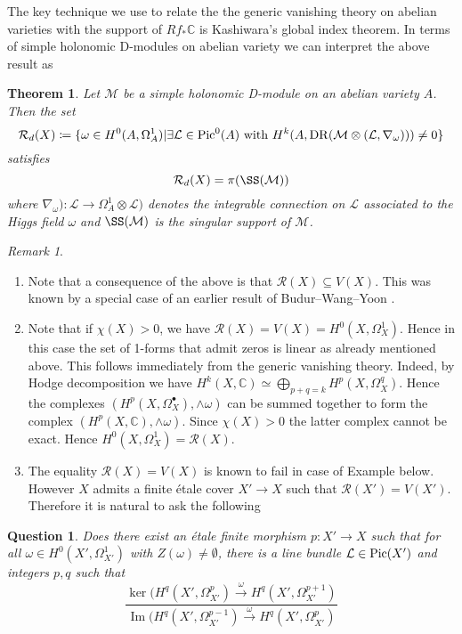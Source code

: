 \documentclass[12pt,reqno]{amsart}
\newtheorem{alphtheorem}{Theorem}
\theoremstyle{question}
\newtheorem{question}[theorem]{Question}
\theoremstyle{definition}
\theoremstyle{remark}
\newtheorem{remark}[theorem]{Remark}
\theoremstyle{cited}
\theoremstyle{citeddef}
\DeclareMathOperator{\im}{Im}
\def\Pic{{\rm Pic}}
\newcommand{\sL}{\mathcal{L}}
\newcommand{\sM}{\mathcal{M}}
\newcommand{\sR}{\mathcal{R}}
\newcommand{\bbC}{\mathbb{C}}
\DeclareMathOperator{\dr}{DR}
\begin{document}
The key technique we
use to relate the the generic vanishing theory on abelian varieties with the support of $Rf_*\bbC$ is Kashiwara's
global index theorem. In terms of simple holonomic D-modules
on abelian variety we can interpret the above result as

\begin{alphtheorem}
Let $\sM$ be a simple holonomic D-module on an abelian variety $A$.
Then the set
\[\sR_d(X)\coloneqq \{\omega\in H^0(A, \Omega_A^1)|\exists \sL\in \Pic^0(A) \text{ with }
H^{k}(A, \dr(\sM\otimes(\sL, \nabla_{\omega}))) \neq 0\}\]
satisfies
\[\sR_d(X) = \pi(\SS(\sM))\]
where $\nabla_{\omega})\colon \sL \to \Omega_A^1\otimes \sL)$
denotes the integrable connection on $\sL$ associated to the Higgs
field $\omega$ and $\SS(\sM)$ is the singular support of $\sM$.
\label{thm:dlinearity}
\end{alphtheorem}
\begin{remark}
\begin{enumerate}
\item Note that a consequence of the above is that $\sR(X)\subseteq V(X)$. This was known by a special case of an earlier result of Budur--Wang--Yoon
\cite{BWY}. 
\item Note that if $\chi(X)>0$, we have $\sR(X) = V(X) = H^0(X, \Omega_X^1)$. Hence in this case the set of 1-forms that admit zeros is linear as already mentioned above. 
This follows immediately from the generic vanishing theory. Indeed, by Hodge decomposition
we have
$H^k(X,\bbC) \simeq \bigoplus_{p+q = k} H^p(X,\Omega_X^q)$. Hence the complexes $(H^p(X, \Omega_X^{\bullet}), \wedge\omega)$ can be summed together to form the complex $(H^p(X, \bbC), \wedge\omega)$. Since $\chi(X)>0$ the latter complex cannot be exact. Hence $H^0(X,\Omega_X^1)
= \sR(X)$.
\item The equality $\sR(X) = V(X)$ is known to fail
in case of Example \cite{ex:DJL} below. However $X$ admits a
finite \'etale cover $X'\to X$ such that $\sR(X') = V(X')$. Therefore it is natural to ask the following 
\end{enumerate}
\end{remark}
\begin{question}
Does there exist an \'etale finite morphism $p\colon  X' \to X$ 
such that for all $\omega \in H^0(X', \Omega_{X'}^1)$ with
$Z(\omega)\neq \emptyset$, there is a line bundle $\sL\in\Pic(X')$
and integers $p, q$ such that
\[\frac{\ker(H^q({X'}, \Omega_{X'}^{p})\xrightarrow{\omega} H^q({X'}, \Omega_{X'}^{p+1})}
{\im(H^q({X'}, \Omega_{X'}^{p-1}) \xrightarrow{\omega} H^q({X'}, \Omega_{X'}^{p})}\]
\end{question}
\end{document}
